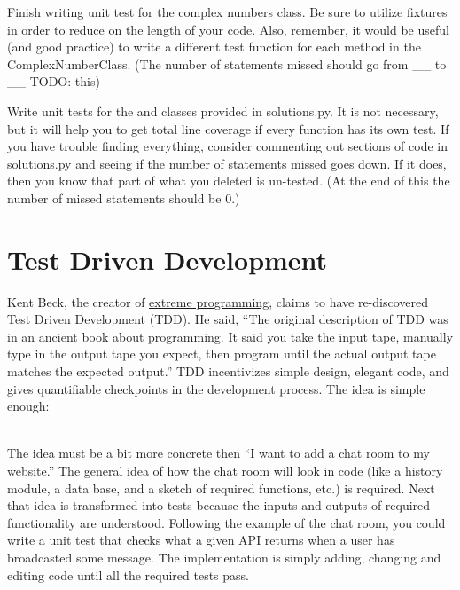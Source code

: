 \begin{problem}
Finish writing unit test for the complex numbers class. Be sure to utilize fixtures in order to reduce on the length of your code.
Also, remember, it would be useful (and good practice) to write a different test function for each method in the ComplexNumberClass.
(The number of statements missed should go from \_\_ to \_\_ TODO: this)
\end{problem}

\begin{problem}
Write unit tests for the  and  classes provided in solutions.py. It is not necessary, but it will help you to get total line coverage if every function has its own test.
If you have trouble finding everything, consider commenting out sections of code in solutions.py and seeing if the number of statements missed goes down.
If it does, then you know that part of what you deleted is un-tested.
(At the end of this the number of missed statements should be 0.)
\end{problem}

\section*{Test Driven Development}

Kent Beck, the creator of \href{https://en.wikipedia.org/wiki/Extreme_programming}{extreme programming}, claims to have re-discovered  Test Driven Development (TDD). He said,
``The original description of TDD was in an ancient book about programming. It said you take the input tape, manually type in the output tape you expect, then program until the actual output tape matches the expected output.''
TDD incentivizes simple design, elegant code, and gives quantifiable checkpoints in the development process.
The idea is simple enough:
\\
The idea must be a bit more concrete then ``I want to add a chat room to my website.'' The general idea of how the chat room will look in code (like a history module, a data base, and a sketch of required functions, etc.) is required.
Next that idea is transformed into tests because the inputs and outputs of required functionality are understood.
Following the example of the chat room, you could write a unit test that checks what a given API returns when a user has broadcasted some message.
The implementation is simply adding, changing and editing code until all the required tests pass.

